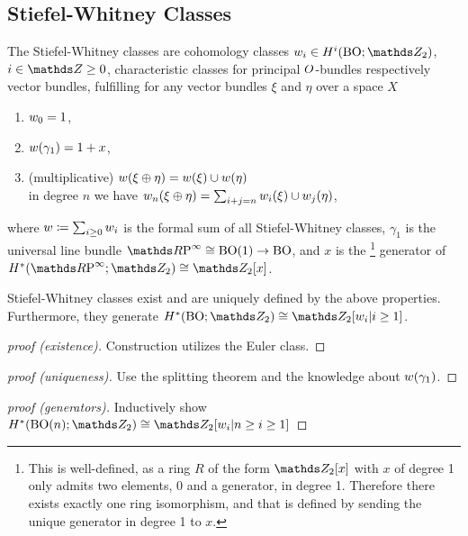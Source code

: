\subsection{Stiefel-Whitney Classes}
\begin{Def}\label{def:swclasses}
  The Stiefel-Whitney classes are cohomology classes
  $w_i\in H^i(\BO;\Zmod2)$, $i\in\Z\geq0$,
  \idest characteristic classes for principal $O$-bundles
  respectively vector bundles, fulfilling
  for any vector bundles $\xi$ and $\eta$ over a space $X$
  \begin{enumerate}
  \item $\w_0%
    = 1$,
  \item $w(\gamma_1) = 1 + x$,
  \item (multiplicative) $w(\xi \oplus \eta) = w(\xi)\cup w(\eta)$
    \\\idest in degree $n$ we have
    $w_n(\xi\oplus\eta) = \sum_{i+j=n}w_i(\xi) \cup w_j(\eta)$,
  \end{enumerate}
  where
  $w\coloneqq\sum_{i\geq 0}w_i$ is the formal sum of all
  Stiefel-Whitney classes,
  $\gamma_1$ is the universal line bundle $\RP\cong\BO(1)\to\BO$,
  and $x$ is the%
  \footnote{
    This is well-defined, as a ring $R$ of the form $\Zmod2[x]$
    with $x$ of degree 1 only admits two elements, $0$ and a
    generator, in degree 1. Therefore there exists exactly one ring
    isomorphism, and that is defined by sending the unique generator in
    degree 1 to $x$.
  }
  generator of $H^*(\RP;\Zmod2)\cong\Zmod2[x]$.
\end{Def}

\begin{Thm} %
Stiefel-Whitney classes exist and are uniquely defined by the above
properties. Furthermore, they generate $H^*(\BO;\Zmod2)\cong \Zmod2[\w_i|i\geq1]$.
\begin{proof}[proof (existence)]
  Construction utilizes the Euler class.
\end{proof}
\begin{proof}[proof (uniqueness)]
  Use the splitting theorem and the knowledge about $w(\gamma_1)$.
\end{proof}
\begin{proof}[proof (generators)]
  Inductively show $H^*(\BO(n);\Zmod2)\cong \Zmod2[\w_i|n\geq i\geq1]$
\end{proof}
\end{Thm}

